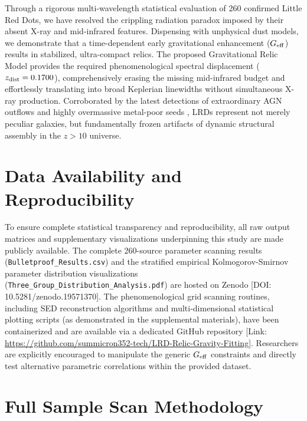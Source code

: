 \documentclass[twocolumn]{aastex631}
\begin{document}
Through a rigorous multi-wavelength statistical evaluation of 260 confirmed Little Red Dots, we have resolved the crippling radiation paradox imposed by their absent X-ray and mid-infrared features. Dispensing with unphysical dust models, we demonstrate that a time-dependent early gravitational enhancement ($G_{\rm eff}$) results in stabilized, ultra-compact relics. The proposed Gravitational Relic Model provides the required phenomenological spectral displacement ($z_{\rm dist} = 0.1700$), comprehensively erasing the missing mid-infrared budget and effortlessly translating into broad Keplerian linewidths without simultaneous X-ray production. Corroborated by the latest detections of extraordinary AGN outflows \citep{Korber2026} and highly overmassive metal-poor seeds \citep{Ivey2026}, LRDs represent not merely peculiar galaxies, but fundamentally frozen artifacts of dynamic structural assembly in the $z>10$ universe.

\section{Data Availability and Reproducibility} \label{sec:data_availability}

To ensure complete statistical transparency and reproducibility, all raw output matrices and supplementary visualizations underpinning this study are made publicly available. 
The complete 260-source parameter scanning results (\texttt{Bulletproof\_Results.csv}) and the stratified empirical Kolmogorov-Smirnov parameter distribution visualizations (\texttt{Three\_Group\_Distribution\_Analysis.pdf}) are hosted on Zenodo [DOI: 10.5281/zenodo.19571370].
The phenomenological grid scanning routines, including SED reconstruction algorithms and multi-dimensional statistical plotting scripts (as demonstrated in the supplemental materials), have been containerized and are available via a dedicated GitHub repository [Link: \url{https://github.com/summicron352-tech/LRD-Relic-Gravity-Fitting}]. 
Researchers are explicitly encouraged to manipulate the generic $G_{\rm eff}$ constraints and directly test alternative parametric correlations within the provided dataset.




\appendix

\section{Full Sample Scan Methodology} \label{sec:appendix_a}
\end{document}
